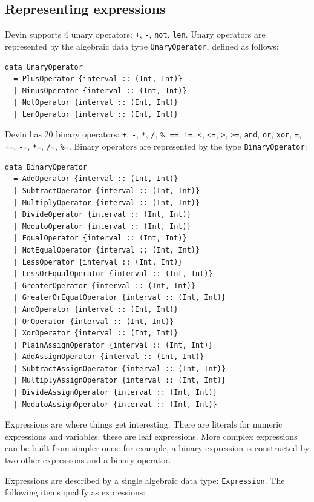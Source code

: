 \documentclass[11pt, american, draft]{PhdThesis}
\begin{document}
  \subsection{Representing expressions}

  Devin supports 4 unary operators: \verb$+$, \verb$-$, \verb$not$, \verb$len$. Unary operators are
  represented by the algebraic data type \verb$UnaryOperator$, defined as follows:

  \begin{verbatim}
data UnaryOperator
  = PlusOperator {interval :: (Int, Int)}
  | MinusOperator {interval :: (Int, Int)}
  | NotOperator {interval :: (Int, Int)}
  | LenOperator {interval :: (Int, Int)}
  \end{verbatim}

  Devin has 20 binary operators: \verb$+$, \verb$-$, \verb$*$, \verb$/$, \verb$%$, \verb$==$,
  \verb$!=$, \verb$<$, \verb$<=$, \verb$>$, \verb$>=$, \verb$and$, \verb$or$, \verb$xor$, \verb$=$,
  \verb$+=$, \verb$-=$, \verb$*=$, \verb$/=$, \verb$%=$. Binary operators are represented by the
  type \verb$BinaryOperator$:

  \begin{verbatim}
data BinaryOperator
  = AddOperator {interval :: (Int, Int)}
  | SubtractOperator {interval :: (Int, Int)}
  | MultiplyOperator {interval :: (Int, Int)}
  | DivideOperator {interval :: (Int, Int)}
  | ModuloOperator {interval :: (Int, Int)}
  | EqualOperator {interval :: (Int, Int)}
  | NotEqualOperator {interval :: (Int, Int)}
  | LessOperator {interval :: (Int, Int)}
  | LessOrEqualOperator {interval :: (Int, Int)}
  | GreaterOperator {interval :: (Int, Int)}
  | GreaterOrEqualOperator {interval :: (Int, Int)}
  | AndOperator {interval :: (Int, Int)}
  | OrOperator {interval :: (Int, Int)}
  | XorOperator {interval :: (Int, Int)}
  | PlainAssignOperator {interval :: (Int, Int)}
  | AddAssignOperator {interval :: (Int, Int)}
  | SubtractAssignOperator {interval :: (Int, Int)}
  | MultiplyAssignOperator {interval :: (Int, Int)}
  | DivideAssignOperator {interval :: (Int, Int)}
  | ModuloAssignOperator {interval :: (Int, Int)}
  \end{verbatim}

  Expressions are where things get interesting. There are literals for numeric expressions and
  variables: these are leaf expressions. More complex expressions can be built from simpler ones:
  for example, a binary expression is constructed by two other expressions and a binary operator.

  Expressions are described by a single algebraic data type: \verb$Expression$. The following items
  qualify as expressions:
\end{document}
